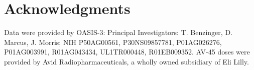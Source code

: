\documentclass{kththesis}
\begin{document}
\chapter{Acknowledgments}
Data were provided by OASIS-3: Principal Investigators: T. Benzinger, D. Marcus, J. Morris; NIH P50AG00561, P30NS09857781, P01AG026276, P01AG003991, R01AG043434, UL1TR000448, R01EB009352. AV-45 doses were provided by Avid Radiopharmaceuticals, a wholly owned subsidiary of Eli Lilly.

\printbibliography[heading=bibintoc]

\appendix


\tailmatter
\end{document}
